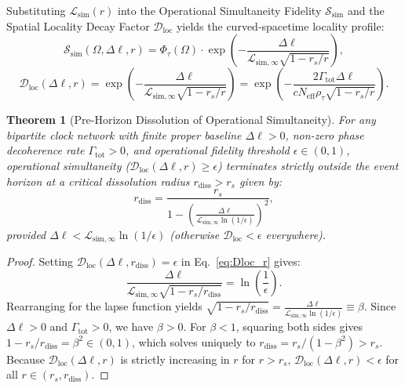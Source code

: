 \documentclass[11pt,a4paper]{article}
\newtheorem{theorem}{Theorem}
\begin{document}
Substituting $\mathcal{L}_{\mathrm{sim}}(r)$ into the Operational Simultaneity Fidelity $\mathcal{S}_{\mathrm{sim}}$ and the Spatial Locality Decay Factor $\mathcal{D}_{\mathrm{loc}}$ yields the curved-spacetime locality profile:
\begin{equation}
\mathcal{S}_{\mathrm{sim}}(\Omega, \Delta\ell, r) = \Phi_\tau(\Omega) \cdot \exp\left(-\frac{\Delta\ell}{\mathcal{L}_{\mathrm{sim},\infty} \sqrt{1 - r_s/r}}\right),
\end{equation}
\begin{equation}
\mathcal{D}_{\mathrm{loc}}(\Delta\ell, r) = \exp\left(-\frac{\Delta\ell}{\mathcal{L}_{\mathrm{sim},\infty} \sqrt{1 - r_s/r}}\right) = \exp\left(-\frac{2 \Gamma_{\mathrm{tot}} \Delta\ell}{c N_{\mathrm{eff}} \rho_\tau \sqrt{1 - r_s/r}}\right).
\label{eq:Dloc_r}
\end{equation}

\begin{theorem}[Pre-Horizon Dissolution of Operational Simultaneity]
For any bipartite clock network with finite proper baseline $\Delta\ell > 0$, non-zero phase decoherence rate $\Gamma_{\mathrm{tot}} > 0$, and operational fidelity threshold $\epsilon \in (0, 1)$, operational simultaneity ($\mathcal{D}_{\mathrm{loc}}(\Delta\ell, r) \ge \epsilon$) terminates strictly outside the event horizon at a critical dissolution radius $r_{\mathrm{diss}} > r_s$ given by:
\begin{equation}
r_{\mathrm{diss}} = \frac{r_s}{1 - \left(\frac{\Delta\ell}{\mathcal{L}_{\mathrm{sim},\infty} \ln(1/\epsilon)}\right)^2},
\label{eq:rdiss}
\end{equation}
provided $\Delta\ell < \mathcal{L}_{\mathrm{sim},\infty} \ln(1/\epsilon)$ (otherwise $\mathcal{D}_{\mathrm{loc}} < \epsilon$ everywhere).
\end{theorem}

\begin{proof}
Setting $\mathcal{D}_{\mathrm{loc}}(\Delta\ell, r_{\mathrm{diss}}) = \epsilon$ in Eq.~\eqref{eq:Dloc_r} gives:
\begin{equation}
\frac{\Delta\ell}{\mathcal{L}_{\mathrm{sim},\infty} \sqrt{1 - r_s/r_{\mathrm{diss}}}} = \ln\left(\frac{1}{\epsilon}\right).
\end{equation}
Rearranging for the lapse function yields $\sqrt{1 - r_s/r_{\mathrm{diss}}} = \frac{\Delta\ell}{\mathcal{L}_{\mathrm{sim},\infty} \ln(1/\epsilon)} \equiv \beta$. Since $\Delta\ell > 0$ and $\Gamma_{\mathrm{tot}} > 0$, we have $\beta > 0$. For $\beta < 1$, squaring both sides gives $1 - r_s/r_{\mathrm{diss}} = \beta^2 \in (0, 1)$, which solves uniquely to $r_{\mathrm{diss}} = r_s / (1 - \beta^2) > r_s$. Because $\mathcal{D}_{\mathrm{loc}}(\Delta\ell, r)$ is strictly increasing in $r$ for $r > r_s$, $\mathcal{D}_{\mathrm{loc}}(\Delta\ell, r) < \epsilon$ for all $r \in (r_s, r_{\mathrm{diss}})$.
\end{proof}
\end{document}
